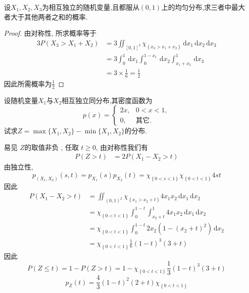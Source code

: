 \documentclass[../main.tex]{subfiles}
\begin{document}
\begin{exercise}{}{}
设\(X_1,X_2,X_3\)为相互独立的随机变量,且都服从\((0,1)\)上的均匀分布,求三者中最大者大于其他两者之和的概率.
\end{exercise}

\begin{proof}
  由对称性, 所求概率等于 \[
\begin{aligned}
  3P\left( X_3> X_1+ X_2 \right)& = 3 \iint_{\left[ 0,1 \right]^{3} }\chi _{\left\{ x_3> x_1+ x_2 \right\}} \,\mathrm{d} x_1\,\mathrm{d} x_2\,\mathrm{d} x_3 \\ 
   &=  3\int_{0}^{1}\,\mathrm{d} x_1\int_{0}^{1-x_1}\,\mathrm{d} x_2\int_{x_1+ x_2}^{1}\,\mathrm{d} x_3\\ 
    &= 3\times \frac{1}{6}= \frac{1}{2}
\end{aligned}
  \]因此所需概率为\(  \frac{1}{2}  \) 
\end{proof}

\begin{exercise}{}{}
设随机变量\(X_1\)与\(X_2\)相互独立同分布,其密度函数为
\begin{equation}
p(x)=
\begin{cases}
2x, & 0<x<1,\\
0, & \text{其它}.
\end{cases}
\end{equation}
试求\(Z=\operatorname{max}\{X_1,X_2\}-\operatorname{min}\{X_1,X_2\}\)的分布.
\end{exercise}
\begin{solution}
易见 \(  Z  \)的取值非负 , 任取 \(  t\ge  0  \), 由对称性我们有  \[
 \begin{aligned}
 P\left( Z>  t \right)&= 2P\left(X_1-X_2>  t \right)   
 \end{aligned}
 \] 由独立性,  \[
 p_{\left( X_1,X_2 \right) }\left( s,t \right)= p_{X_1}\left( s \right)p_{X_2}\left( t \right)= \chi _{\left\{ 0< s< 1 \right\}}\chi _{\left\{ 0< t< 1 \right\}}4st   
 \]因此 \[
 \begin{aligned}
 P\left( X_1-X_2> t \right)&=  \iint_{\left( 0,1 \right)^{2} }\chi _{\left\{ x_1> x_2+ t \right\}}4x_1x_2\,\mathrm{d} x_1 \,\mathrm{d} x_2 \\ 
  &= \chi _{\left\{ 0< t< 1 \right\}}\int_{0}^{1-t} \int_{x_2+ t}^{1}4x_1x_2\,\mathrm{d} x_1\,\mathrm{d} x_2 \\
   &= \chi _{\left\{ 0< t< 1 \right\}}\int_{0}^{1-t} 2x_2\left( 1-\left( x_2+ t \right)^{2} \right)\,\mathrm{d} x_2\\ 
    &= \chi _{\left\{ 0< t< 1 \right\}}\frac{1}{6}\left( 1-t \right)^{3}\left( 3+ t \right)  
 \end{aligned} 
 \]因此 \[
 P\left( Z\le t \right)= 1-P\left( Z> t \right)= 1-\chi _{\left\{ 0< t< 1 \right\}}\frac{1}{3}\left( 1-t \right)^{3}\left( 3+ t \right)   
 \] \[
 p_{Z}\left( t \right)=\frac{4}{3}\left( 1-t \right)^{2}\left( 2+ t \right)    \chi _{\left\{ 0< t< 1 \right\}}
 \]
\end{solution}
\end{document}
